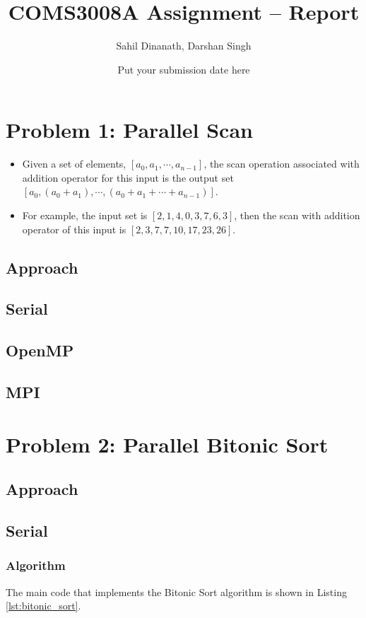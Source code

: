 
\title{COMS3008A Assignment -- Report}
\author{Sahil Dinanath, Darshan Singh}
\date{Put your submission date here} 
\maketitle 
\pagestyle{fancy}
\fancyhf{}
\fancyhead[R]{\thepage}
{} 
\section{Problem 1: Parallel Scan}
\begin{itemize}
	\item  Given a set of elements, $[a_0,a_1,\dotsm,a_{n-1}]$, the scan operation associated with addition operator for this input is the output set $[a_0,(a_0+a_1),\dotsm,(a_0+a_1+\dotsm+a_{n-1})]$. 
	\item For example, the input set is $[2,1,4,0,3,7,6,3]$, then the scan with addition operator of this input is $[2,3,7,7,10,17,23,26]$. 
\end{itemize}
\subsection*{Approach}
\subsection{Serial} 
\subsection{OpenMP} 
\subsection{MPI}
\pagebreak
\section{Problem 2: Parallel Bitonic Sort}
\subsection*{Approach}
\subsection{Serial} 
\subsubsection{Algorithm}
The main code that implements the Bitonic Sort algorithm is shown in Listing \ref{lst:bitonic_sort}.

